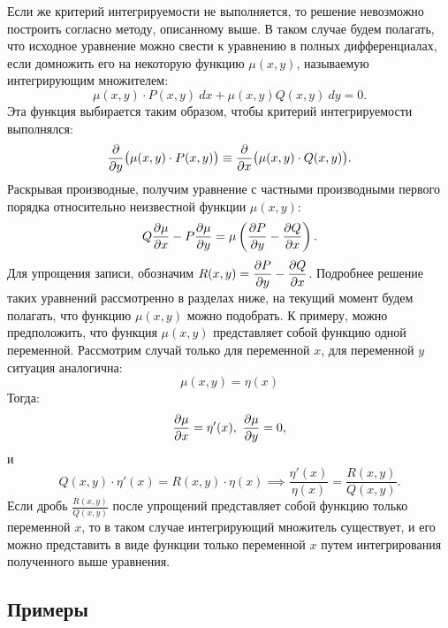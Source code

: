 	Если же критерий интегрируемости не выполняется, то решение невозможно построить согласно методу, описанному выше. В таком случае будем полагать, что исходное уравнение можно свести к уравнению в полных дифференциалах, если домножить его на некоторую функцию $\mu(x, y)$, называемую интегрирующим множителем:
	\[ \mu(x, y) \cdot P(x, y) ~ dx + \mu(x, y) Q(x, y) ~ dy = 0. \]
	Эта функция выбирается таким образом, чтобы критерий интегрируемости выполнялся:
	\[ \dfrac{\partial }{\partial y} \bigl( \mu(x, y) \cdot P(x, y) \bigr) \equiv \dfrac{\partial }{\partial x} \bigl( \mu(x, y) \cdot Q(x, y) \bigr). \]
	Раскрывая производные, получим уравнение с частными производными первого порядка относительно неизвестной функции $ \mu(x, y) $:
    \[ Q\dfrac{\partial \mu}{\partial x} - P\dfrac{\partial \mu}{\partial y} = \mu \left( \dfrac{\partial P}{\partial y} - \dfrac{\partial Q}{\partial x} \right). \]
    Для упрощения записи, обозначим $R(x, y) = \dfrac{\partial P}{\partial y} - \dfrac{\partial Q}{\partial x}$. Подробнее решение таких уравнений рассмотренно в разделах ниже, на текущий момент будем полагать, что функцию $\mu(x, y)$ можно подобрать. К примеру, можно предположить, что функция $\mu(x, y)$ представляет собой функцию одной переменной. Рассмотрим случай только для переменной $x$, для переменной $y$ ситуация аналогична:
    \[ \mu(x, y) = \eta(x) \]
    Тогда:
    \[ \dfrac{\partial \mu}{\partial x} = \eta'(x), ~ \dfrac{\partial \mu}{\partial y} = 0, \]
    и
    \[ Q(x, y) \cdot \eta'(x) = R(x, y) \cdot \eta(x) \implies \frac{\eta'(x)}{\eta(x)} = \frac{R(x, y)}{Q(x, y)}. \]
    Если дробь $\frac{R(x, y)}{Q(x, y)}$ после упрощений представляет собой функцию только переменной $x$, то в таком случае интегрирующий множитель существует, и его можно представить в виде функции только переменной $x$ путем интегрирования полученного выше уравнения.

    \subsection{Примеры}

